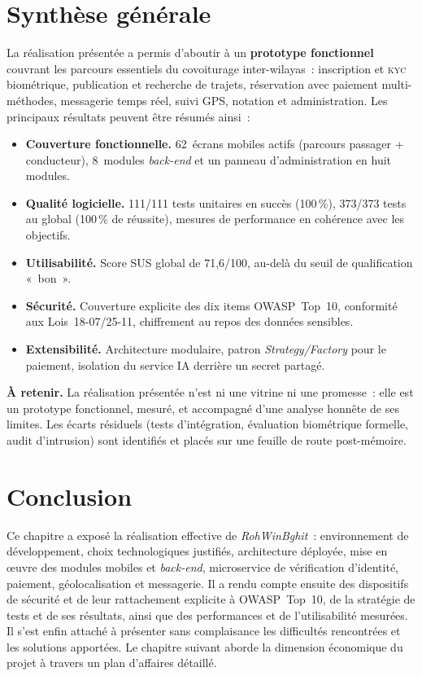 \documentclass[12pt, a4paper, oneside]{report}
\begin{document}
\section{Synthèse générale}
\label{sec:synthese-realisation}

La réalisation présentée a permis d'aboutir à un \textbf{prototype fonctionnel} couvrant les parcours essentiels du covoiturage inter-wilayas~: inscription et \textsc{kyc} biométrique, publication et recherche de trajets, réservation avec paiement multi-méthodes, messagerie temps réel, suivi GPS, notation et administration. Les principaux résultats peuvent être résumés ainsi~:

\begin{itemize}
  \item \textbf{Couverture fonctionnelle.} 62~écrans mobiles actifs (parcours passager + conducteur), 8~modules \textit{back-end} et un panneau d'administration en huit modules.
  \item \textbf{Qualité logicielle.} 111/111 tests unitaires en succès (100\,\%), 373/373 tests au global (100\,\% de réussite), mesures de performance en cohérence avec les objectifs.
  \item \textbf{Utilisabilité.} Score SUS global de 71,6/100, au-delà du seuil de qualification «~bon~».
  \item \textbf{Sécurité.} Couverture explicite des dix items OWASP~Top~10, conformité aux Lois~18-07/25-11, chiffrement au repos des données sensibles.
  \item \textbf{Extensibilité.} Architecture modulaire, patron \textit{Strategy/Factory} pour le paiement, isolation du service IA derrière un secret partagé.
\end{itemize}

\begin{highlight}
\textbf{À retenir.} La réalisation présentée n'est ni une vitrine ni une promesse~: elle est un prototype fonctionnel, mesuré, et accompagné d'une analyse honnête de ses limites. Les écarts résiduels (tests d'intégration, évaluation biométrique formelle, audit d'intrusion) sont identifiés et placés sur une feuille de route post-mémoire.
\end{highlight}

\section*{Conclusion}

Ce chapitre a exposé la réalisation effective de \textit{RohWinBghit}~: environnement de développement, choix technologiques justifiés, architecture déployée, mise en œuvre des modules mobiles et \textit{back-end}, microservice de vérification d'identité, paiement, géolocalisation et messagerie. Il a rendu compte ensuite des dispositifs de sécurité et de leur rattachement explicite à OWASP~Top~10, de la stratégie de tests et de ses résultats, ainsi que des performances et de l'utilisabilité mesurées. Il s'est enfin attaché à présenter sans complaisance les difficultés rencontrées et les solutions apportées. Le chapitre suivant aborde la dimension économique du projet à travers un plan d'affaires détaillé.
\end{document}
